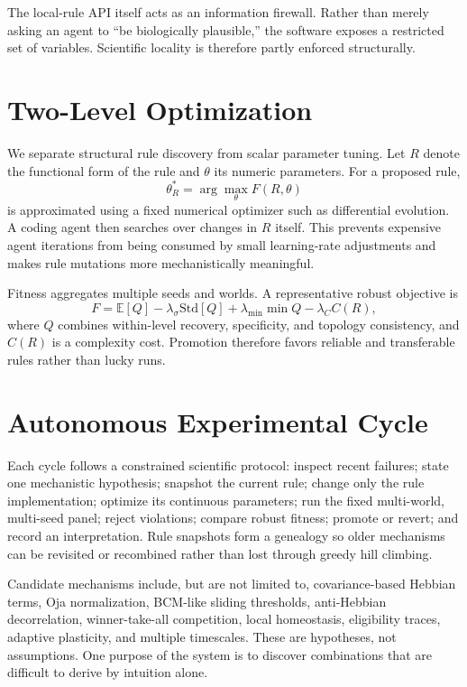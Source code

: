 \documentclass[11pt]{article}
\begin{document}
The local-rule API itself acts as an information firewall. Rather than merely asking an agent to ``be biologically plausible,'' the software exposes a restricted set of variables. Scientific locality is therefore partly enforced structurally.

\section{Two-Level Optimization}
We separate structural rule discovery from scalar parameter tuning. Let $R$ denote the functional form of the rule and $\theta$ its numeric parameters. For a proposed rule,
\begin{equation}
\theta_R^*=\arg\max_\theta F(R,\theta)
\end{equation}
is approximated using a fixed numerical optimizer such as differential evolution. A coding agent then searches over changes in $R$ itself. This prevents expensive agent iterations from being consumed by small learning-rate adjustments and makes rule mutations more mechanistically meaningful.

Fitness aggregates multiple seeds and worlds. A representative robust objective is
\begin{equation}
F = \mathbb{E}[Q] - \lambda_\sigma\mathrm{Std}[Q] + \lambda_{\min}\min Q - \lambda_C C(R),
\end{equation}
where $Q$ combines within-level recovery, specificity, and topology consistency, and $C(R)$ is a complexity cost. Promotion therefore favors reliable and transferable rules rather than lucky runs.

\section{Autonomous Experimental Cycle}
Each cycle follows a constrained scientific protocol: inspect recent failures; state one mechanistic hypothesis; snapshot the current rule; change only the rule implementation; optimize its continuous parameters; run the fixed multi-world, multi-seed panel; reject violations; compare robust fitness; promote or revert; and record an interpretation. Rule snapshots form a genealogy so older mechanisms can be revisited or recombined rather than lost through greedy hill climbing.

Candidate mechanisms include, but are not limited to, covariance-based Hebbian terms, Oja normalization, BCM-like sliding thresholds, anti-Hebbian decorrelation, winner-take-all competition, local homeostasis, eligibility traces, adaptive plasticity, and multiple timescales. These are hypotheses, not assumptions. One purpose of the system is to discover combinations that are difficult to derive by intuition alone.
\end{document}
